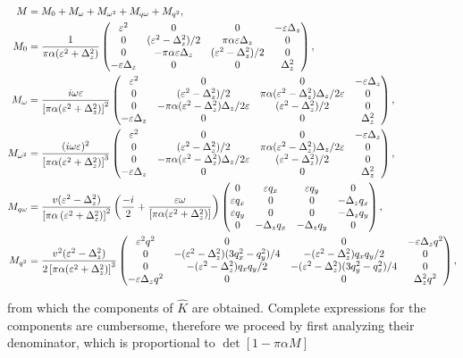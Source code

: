 \beml
\label{chap1:eq:M}
\begin{align}
M &=M_0+M_\omega+M_{\omega^2}+M_{q\omega}+M_{q^2},\\
M_0 &= 
\frac{1}{\pi\alpha(\varepsilon^2+\Delta_z^2)} 
\begin{pmatrix}
\varepsilon^2& 0 & 0 & -\varepsilon \Delta_z \\
 0 & (\varepsilon ^2-\Delta_z^2)/2 & \pi\alpha \varepsilon \Delta_z & 0 \\
 0 & -\pi \alpha \varepsilon \Delta_z & (\varepsilon ^2-\Delta_z^2)/2 & 0 \\
-\varepsilon \Delta_z & 0 & 0 & \Delta_z^2 
\end{pmatrix},\\
M_\omega & =\frac{i\omega \varepsilon}{\left[\pi  \alpha  (\varepsilon^2+\Delta_z^2)\right]^2} 
\begin{pmatrix}
\varepsilon^2 & 0 & 0 &-\varepsilon\Delta_z\\
0 & (\varepsilon ^2-\Delta_z^2)/2 & \pi \alpha (\varepsilon^2-\Delta_z^2)\Delta_z/2\varepsilon& 0 \\
 0 &- \pi \alpha (\varepsilon^2-\Delta_z^2)\Delta_z/2\varepsilon& (\varepsilon ^2-\Delta_z^2)/2  & 0 \\
-\varepsilon\Delta_z& 0 & 0 & \Delta_z^2  
\end{pmatrix},\\
M_{\omega^2} & =\frac{(i\omega \varepsilon)^2}{\left[\pi  \alpha  (\varepsilon^2+\Delta_z^2)\right]^3}
\begin{pmatrix}
\varepsilon^2 & 0 & 0 &-\varepsilon\Delta_z\\
0 & (\varepsilon ^2-\Delta_z^2)/2 & \pi \alpha (\varepsilon^2-\Delta_z^2)\Delta_z/2\varepsilon& 0 \\
 0 & -\pi \alpha (\varepsilon^2-\Delta_z^2)\Delta_z/2\varepsilon& (\varepsilon ^2-\Delta_z^2)/2  & 0 \\
-\varepsilon\Delta_z& 0 & 0 & \Delta_z^2  
\end{pmatrix},\\
M_{q\omega} & =\frac{v(\varepsilon^2-\Delta_z^2)}{\left[\pi \alpha \left(\varepsilon^2+\Delta_z^2\right)\right]^2}\left(\frac{-i}{2}+ \frac{\varepsilon\omega}{\left[\pi\alpha(\varepsilon^2+\Delta_z^2)\right]}\right) 
\begin{pmatrix}
 0 & \varepsilon  q_x& \varepsilon  q_y& 0 \\
 \varepsilon  q_x & 0 & 0 & -\Delta_z q_x\\
 \varepsilon  q_y & 0 & 0 & -\Delta_z q_y\\
 0 & -\Delta_z q_x & -\Delta_z q_y & 0 
\end{pmatrix},\\
M_{q^2} & =\frac{v^2 (\varepsilon^2-\Delta_z^2)}{2\left[\pi\alpha(\varepsilon^2+\Delta_z^2)\right]^3} 
\begin{pmatrix}
\varepsilon^2q^2& 0 & 0 & -\varepsilon\Delta_z q^2 \\
 0 & -(\varepsilon^2-\Delta_z^2) (3q_x^2-q_y^2)/4 & - (\varepsilon^2-\Delta_z^2) q_xq_y/2 & 0 \\
 0 & - (\varepsilon^2-\Delta_z^2) q_xq_y/2 & -(\varepsilon^2-\Delta_z^2) (3q_y^2-q_x^2)/4 & 0 \\
-\varepsilon \Delta_z q^2  & 0 & 0 & \Delta_z^2q^2
\end{pmatrix},
\end{align}
\eml

from which the components of $\hat{K}$ are obtained. 
Complete expressions for the components are cumbersome, therefore we proceed by first analyzing their denominator, which is proportional to $\det [1-\pi\alpha M]$

